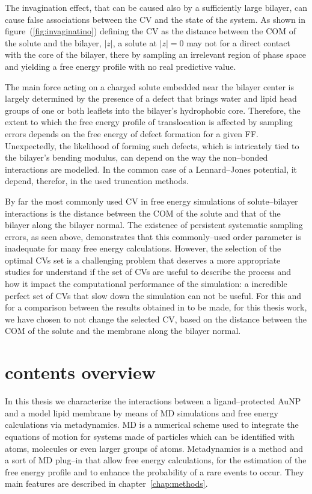 The invagination effect, that can be caused also by a sufficiently large bilayer, can cause false associations between the \ac{CV} and the state of the system. As shown in figure~(\ref{fig:invaginatino}) defining the \ac{CV} as the distance between the \ac{COM} of the solute and the bilayer, $|z|$, a solute at $|z| = 0$ may not for a direct contact with the core of the bilayer, there by sampling an irrelevant region of phase space and yielding a free energy profile with no real predictive value.

The main force acting on a charged solute embedded near the bilayer center is largely determined by the presence of a defect that brings water and lipid head groups of one or both leaflets into the bilayer's hydrophobic core. Therefore, the extent to which the free energy profile of translocation is affected by sampling errors depends on the free energy of defect formation for a given \ac{FF}. Unexpectedly, the likelihood of forming such defects, which is intricately tied to the bilayer's bending modulus, can depend on the way the non--bonded interactions are modelled. In the common case of a Lennard--Jones potential, it depend, therefor, in the used truncation methods. 

By far the most commonly used \ac{CV} in free energy simulations of solute--bilayer interactions is the distance between the \ac{COM} of the solute and that of the bilayer along the bilayer normal. The existence of persistent systematic sampling errors, as seen above, demonstrates that this commonly--used order parameter is inadequate for many free energy calculations. However, the selection of the optimal \acp{CV} set is a challenging problem that deserves a more appropriate studies for understand if the set of \acp{CV} are useful to describe the process and how it impact the computational performance of the simulation: a incredible perfect set of \acp{CV} that slow down the simulation can not be useful. For this and for a comparison between the results obtained in \cite{ourPaper} to be made, for this thesis work, we have chosen to not change the selected \ac{CV}, based on the distance between the \ac{COM} of the solute and the membrane along the bilayer normal. 

\section{contents overview}
In this thesis we characterize the interactions between a ligand--protected \ac{AuNP} and a model lipid membrane by means of \ac{MD} simulations and free energy calculations via metadynamics. \ac{MD} is a numerical scheme used to integrate the equations of motion for systems made of particles which can be identified with atoms, molecules or even larger groups of atoms. Metadynamics is a method and a sort of \ac{MD} plug--in that allow free energy calculations, for the estimation of the free energy profile and to enhance the probability of a rare events to occur. They main features are described in chapter~\ref{chap:methods}.


